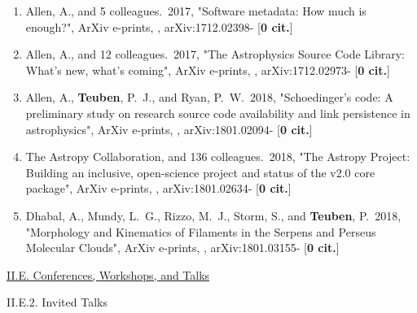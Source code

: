 \documentclass[11pt,letterpaper]{article}
\begin{document}
\begin{enumerate}[resume,label=\textbf{\arabic*}.]
\item  
Allen, A., and 5 colleagues.\  2017,  "Software metadata: How much is 
enough?", ArXiv e-prints,  , arXiv:1712.02398- [{\bf 0 cit.}] 

\item  
Allen, A., and 12 colleagues.\  2017,  "The Astrophysics Source Code 
Library: What's new, what's coming", ArXiv e-prints,  , arXiv:1712.02973- 
[{\bf 0 cit.}] 





\item  
Allen, A., {\bf Teuben}, P.~J., and Ryan, P.~W.\  2018,  "Schoedinger's code: A 
preliminary study on research source code availability and link persistence 
in astrophysics", ArXiv e-prints,  , arXiv:1801.02094- [{\bf 0 cit.}] 

\item  
The Astropy Collaboration, and 136 colleagues.\  2018,  "The Astropy 
Project: Building an inclusive, open-science project and status of the v2.0 
core package", ArXiv e-prints,  , arXiv:1801.02634- [{\bf 0 cit.}] 

\item  
Dhabal, A., Mundy, L.~G., Rizzo, M.~J., Storm, S., and {\bf Teuben}, P.\  2018,  
"Morphology and Kinematics of Filaments in the Serpens and Perseus 
Molecular Clouds", ArXiv e-prints,  , arXiv:1801.03155- [{\bf 0 cit.}] 


  

\end{enumerate}









\underline{II.E. Conferences, Workshops, and Talks}


II.E.2. Invited Talks
\end{document}
